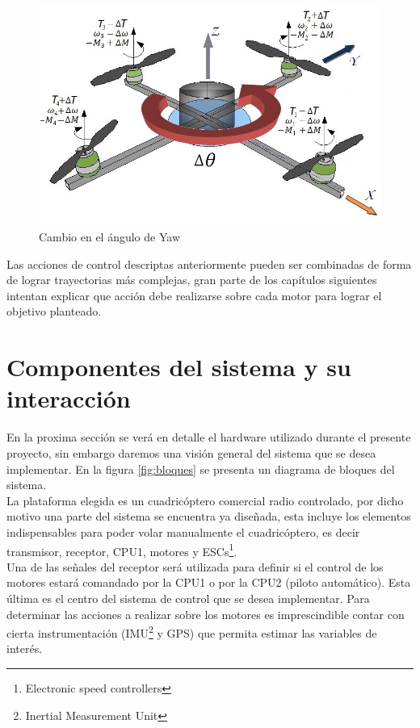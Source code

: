 \documentclass[main]{subfiles}
\begin{document}
\begin{figure}[!h]
\centering
\includegraphics[scale=0.4]{./pics_general/quad_theta.jpg}
\caption{Cambio en el \'angulo de Yaw}
\label{fig:quad_theta}
\end{figure}
Las acciones de control descriptas anteriormente pueden ser combinadas de forma de lograr trayectorias m\'as complejas, gran parte de los cap\'itulos siguientes intentan explicar que acci\'on debe realizarse sobre cada motor para lograr el objetivo planteado.

\section{Componentes del sistema y su interacci\'on}

En la proxima secci\'on se ver\'a en detalle el hardware utilizado durante el presente proyecto, sin embargo daremos una visi\'on general del sistema que se desea implementar. En la figura \ref{fig:bloques} se presenta un diagrama de bloques del sistema.\\


La plataforma elegida es un cuadric\'optero comercial radio controlado, por dicho motivo una parte del sistema se encuentra ya diseñada, esta incluye los elementos indispensables para poder volar manualmente el cuadric\'optero, es decir transmisor, receptor, CPU1, motores y ESCs\footnote{Electronic speed controllers}.\\   

Una de las señales del receptor ser\'a utilizada para definir si el control de los motores estar\'a comandado por la CPU1 o por la CPU2 (piloto autom\'atico). Esta \'ultima es el centro del sistema de control que se desea implementar. Para determinar las acciones a realizar sobre los motores es imprescindible contar con cierta instrumentaci\'on (IMU\footnote{Inertial Measurement Unit} y GPS) que permita estimar las variables de inter\'es.\\
\end{document}
